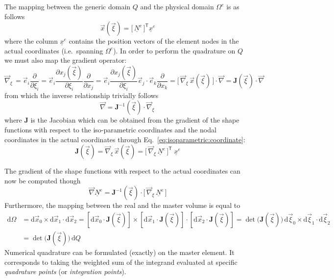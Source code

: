 \documentclass[times,namecite]{goose-article}
\begin{document}
The mapping between the generic domain $Q$ and the physical domain $\Omega^e$ is as follows
\begin{equation}
\label{eq:isoparametric:coordinate}
  \vec{x} ( \vec{\xi} ) = \big[\, \underline{N}^{e} \,\big]^\mathsf{T} \underline{x}^e
\end{equation}
where the column $\underline{x}^e$ contains the position vectors of the element nodes in the actual coordinates (i.e.\ spanning $\Omega^e$). In order to perform the quadrature on $Q$ we must also map the gradient operator:
\begin{equation}
  \vec{\nabla}_{\xi}\,
  =
  \vec{e}_i \frac{\partial}{\partial \xi_i}
  =
  \vec{e}_i \frac{\partial x_j(\vec{\xi})}{\partial \xi_i} \frac{\partial}{\partial x_j}
  =
  \vec{e}_i \frac{\partial x_j(\vec{\xi})}{\partial \xi_i} \vec{e}_j \cdot \vec{e}_k \frac{\partial}{\partial x_k}
  =
  \big[\, \vec{\nabla}_{\xi}\, \vec{x}(\vec{\xi}) \,\big] \cdot \vec{\nabla}
  =
  \bm{J}(\vec{\xi}) \cdot \vec{\nabla}
\end{equation}
from which the inverse relationship trivially follows
\begin{equation}
  \vec{\nabla} = \bm{J}^{-1}(\vec{\xi}) \cdot \vec{\nabla}_{\xi}\,
\end{equation}
where $\bm{J}$ is the Jacobian which can be obtained from the gradient of the shape functions with respect to the iso-parametric coordinates and the nodal coordinates in the actual coordinates through Eq.~\eqref{eq:isoparametric:coordinate}:
\begin{equation}
  \bm{J}(\vec{\xi})
  =
  \vec{\nabla}_{\xi}\, \vec{x}(\vec{\xi})
  =
  \big[\, \vec{\nabla}_{\xi}\, \underline{N}^{e} \,\big]^\mathsf{T} \; \underline{x}^e
\end{equation}

The gradient of the shape functions with respect to the actual coordinates can now be computed though
\begin{equation}
  \vec{\nabla} \underline{N}^{e}
  =
  \bm{J}^{-1}(\vec{\xi}) \cdot  \big[\, \vec{\nabla}_{\xi}\, \underline{N}^{e} \,\big]
\end{equation}
Furthermore, the mapping between the real and the master volume is equal to
\begin{align}
  \mathrm{d} \Omega
  &=
  \mathrm{d} \vec{x}_0 \times \mathrm{d} \vec{x}_1 \cdot \mathrm{d} \vec{x}_2
  =
  \left[ \mathrm{d} \vec{x}_0 \cdot \bm{J}(\vec{\xi}) \right] \times
  \left[ \mathrm{d} \vec{x}_1 \cdot \bm{J}(\vec{\xi}) \right] \cdot
  \left[ \mathrm{d} \vec{x}_2 \cdot \bm{J}(\vec{\xi}) \right]
  =
  \det \big( \bm{J}(\vec{\xi}) \big)\,
  \mathrm{d} \vec{\xi}_0 \times \mathrm{d} \vec{\xi}_1 \cdot \mathrm{d} \vec{\xi}_2
  \\
  &=
  \det \big( \bm{J}(\vec{\xi}) \big)\, \mathrm{d} Q
\end{align}
Numerical quadrature can be formulated (exactly) on the master element. It corresponds to taking the weighted sum of the integrand evaluated at specific \emph{quadrature points} (or \emph{integration points}).
\end{document}
